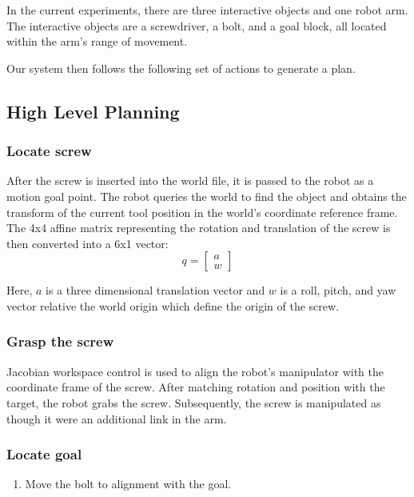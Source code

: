\documentclass[10pt, conference]{IEEEtran}
\begin{document}
  In the current experiments, there are three interactive objects and
  one robot arm. The interactive objects are a screwdriver, a bolt, and
  a goal block, all located within the arm's range of movement.

  Our system then follows the following set of actions to generate a
  plan.
\subsection{High Level Planning}
\label{sec-3-2}
\subsubsection{Locate screw}
\label{sec-3-2-1}

    After the screw is inserted into the world file, it is passed to the
    robot as a motion goal point. The robot queries the world to find the
    object and obtains the transform of the current tool position in the
    world's coordinate reference frame. The 4x4 affine matrix
    representing the rotation and translation of the screw is then
    converted into a 6x1 vector:
    \begin{equation}
    q = \begin{bmatrix}
                a \\
                w
              \end{bmatrix}
    \end{equation}

    Here, \(a\) is a three dimensional translation vector and \(w\)
    is a roll, pitch, and yaw vector relative the world origin which
    define the origin of the screw.
\subsubsection{Grasp the screw}
\label{sec-3-2-2}

    Jacobian workspace control is used to align the robot's manipulator
    with the coordinate frame of the screw. After matching rotation and
    position with the target, the robot grabs the screw. Subsequently,
    the screw is manipulated as though it were an additional link in the
    arm.
\subsubsection{Locate goal}
\label{sec-3-2-3}

\begin{enumerate}
\item Move the bolt to alignment with the goal.
\end{enumerate}
\end{document}

